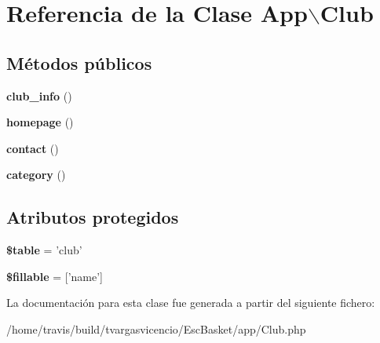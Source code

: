 \hypertarget{class_app_1_1_club}{\section{\-Referencia de la \-Clase \-App$\backslash$\-Club}
\label{class_app_1_1_club}
}
\subsection*{\-Métodos públicos}
\begin{DoxyCompactItemize}
\item 
\hypertarget{class_app_1_1_club_aa4c36ac282624fe88b6c28086fac04cc}{{\bfseries club\-\_\-info} ()}\label{class_app_1_1_club_aa4c36ac282624fe88b6c28086fac04cc}

\item 
\hypertarget{class_app_1_1_club_abc390a2b4ac1df679edfbd4c6928b13f}{{\bfseries homepage} ()}\label{class_app_1_1_club_abc390a2b4ac1df679edfbd4c6928b13f}

\item 
\hypertarget{class_app_1_1_club_a3f070b63c972dc7affc8aa22f7f03b56}{{\bfseries contact} ()}\label{class_app_1_1_club_a3f070b63c972dc7affc8aa22f7f03b56}

\item 
\hypertarget{class_app_1_1_club_a40af8180ce5a7597f4607ed54ca6d664}{{\bfseries category} ()}\label{class_app_1_1_club_a40af8180ce5a7597f4607ed54ca6d664}

\end{DoxyCompactItemize}
\subsection*{\-Atributos protegidos}
\begin{DoxyCompactItemize}
\item 
\hypertarget{class_app_1_1_club_a881a65af16195659eef400a31e2d5a81}{{\bfseries \$table} = 'club'}\label{class_app_1_1_club_a881a65af16195659eef400a31e2d5a81}

\item 
\hypertarget{class_app_1_1_club_a35e8db592661306209ccd09530b64db9}{{\bfseries \$fillable} = \mbox{[}'name'\mbox{]}}\label{class_app_1_1_club_a35e8db592661306209ccd09530b64db9}

\end{DoxyCompactItemize}


\-La documentación para esta clase fue generada a partir del siguiente fichero\-:\begin{DoxyCompactItemize}
\item 
/home/travis/build/tvargasvicencio/\-Esc\-Basket/app/\-Club.\-php\end{DoxyCompactItemize}
